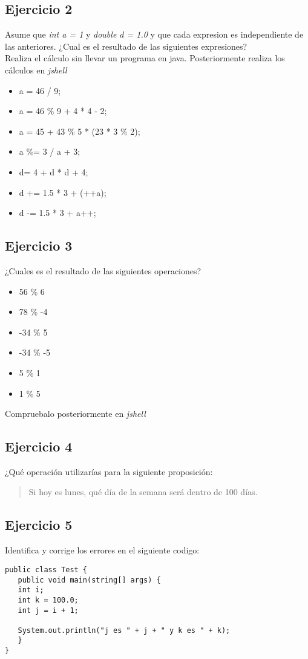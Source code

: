 \documentclass[4paper]{article}
\begin{document}
\subsection{Ejercicio 2}
Asume que \emph{int a = 1} y \emph{double d = 1.0} y que cada expresion es independiente de las anteriores. ¿Cual es el resultado de las siguientes expresiones?\\
Realiza el cálculo sin llevar un programa en java. Posteriormente realiza los cálculos en \emph{jshell}
\begin{itemize}
\item a = 46 / 9;
\item a = 46 \% 9 + 4 * 4 - 2;
\item a = 45 + 43 \% 5 * (23 * 3 \% 2);
\item a \%= 3 / a + 3;
\item d= 4 + d * d + 4;
\item d += 1.5 * 3 + (++a);
\item d -= 1.5 * 3 + a++;
\end{itemize}
\subsection{Ejercicio 3}
¿Cuales es el resultado de las siguientes operaciones?
\begin{itemize}
\item 56 \% 6
\item 78 \% -4
\item -34 \% 5
\item -34 \% -5
\item 5 \% 1
\item 1 \% 5
\end{itemize}
Compruebalo posteriormente en \emph{jshell}
\subsection{Ejercicio 4}
¿Qué operación utilizarías para la siguiente proposición:
\begin{verse}
Si hoy es lunes, qué día de la semana será dentro de 100 días.
\end{verse}

\subsection{Ejercicio 5}
Identifica y corrige los errores en el siguiente codigo:
\begin{verbatim}
public class Test {
   public void main(string[] args) {
   int i;
   int k = 100.0;
   int j = i + 1;

   System.out.println("j es " + j + " y k es " + k);
   }
}
\end{verbatim}
\end{document}

